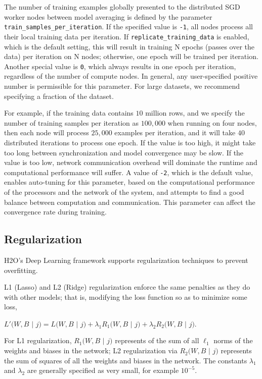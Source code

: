 The number of training examples globally presented to the distributed SGD worker nodes between model averaging is defined by the parameter \texttt{train\_samples\_per\_iteration}. If the specified value is \texttt{-1}, all nodes process all their local training data per iteration. If \texttt{replicate\_training\_data} is enabled, which is the default setting, this will result in training N epochs (passes over the data) per iteration on N nodes; otherwise, one epoch will be trained per iteration. Another special value is \texttt{0}, which always results in one epoch per iteration, regardless of the number of compute nodes. In general, any user-specified positive number is permissible for this parameter. For large datasets, we recommend specifying a fraction of the dataset. 

For example, if the training data contains $10$ million rows, and we specify the number of training samples per iteration as $100,000$ when running on four nodes, then each node will process $25,000$ examples per iteration, and it will take $40$ distributed iterations to process one epoch. If the value is too high, it might take too long between synchronization and model convergence may be slow.  If the value is too low, network communication overhead will dominate the runtime and computational performance will suffer. A value of \texttt{-2}, which is the default value, enables auto-tuning for this parameter, based on the computational performance of the processors and the network of the system, and attempts to find a good balance between computation and communication. This parameter can affect the convergence rate during training.

\noindent
\subsection{Regularization} 
\label{ssec:Regularization}
H2O's Deep Learning framework supports regularization techniques to prevent overfitting. 

L1 (Lasso) and L2 (Ridge) regularization enforce the same penalties as they do with other models; that is, modifying the loss function so as to minimize some loss, %
\medskip
\begin{center}
$L'(W,B$ $|$ $j) = L(W,B$ $|$ $j) + \lambda_1 R_1(W,B$ $|$ $j) + \lambda_2 R_2(W,B$ $|$ $j)$.
\end{center}
\medskip
For L1 regularization, $R_1(W,B$ $|$ $j)$ represents of the sum of all $\ell_1$ norms of the weights and biases in the network; L2 regularization via $R_2(W,B$ $|$ $j)$ represents the sum of squares of all the weights and biases in the network. The constants $\lambda_1$ and $\lambda_2$ are generally specified as very small, for example $10^{-5}$.


